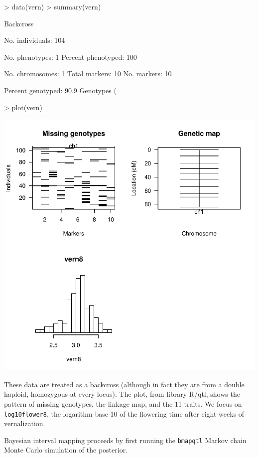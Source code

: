 \documentclass{article}
\begin{document}
\begin{Schunk}
\begin{Sinput}
> data(vern)
> summary(vern)
\end{Sinput}
\begin{Soutput}
    Backcross

    No. individuals:  104 

    No. phenotypes:   1 
    Percent phenotyped:  100 

    No. chromosomes:  1 
    Total markers:    10 
    No. markers:      10 

    Percent genotyped:  90.9 
    Genotypes (%
\end{Soutput}
\begin{Sinput}
> plot(vern)
\end{Sinput}
\end{Schunk}
\includegraphics{bim_summary-002}

These data are treated as a backcross (although in fact they are from
a double haploid, homozygous at every locus). The plot, from library
R/qtl, shows the pattern of missing genotypes, the linkage map, and
the 11 traits. We focus on \texttt{log10flower8}, the logarithm base
10 of the flowering time after eight weeks of vernalization.

Bayesian interval mapping proceeds by first running the
\texttt{bmapqtl} Markov chain Monte Carlo simulation of the posterior.
\end{document}
